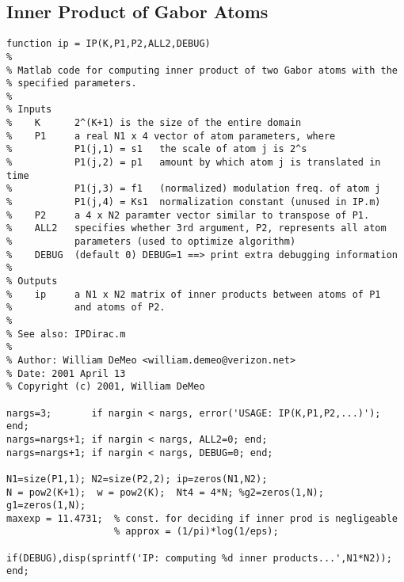 \subsection{Inner Product of Gabor Atoms}\label{sec:IP}
\begin{verbatim}
function ip = IP(K,P1,P2,ALL2,DEBUG)
%
% Matlab code for computing inner product of two Gabor atoms with the
% specified parameters.
%
% Inputs
%    K      2^(K+1) is the size of the entire domain
%    P1     a real N1 x 4 vector of atom parameters, where
%           P1(j,1) = s1   the scale of atom j is 2^s
%           P1(j,2) = p1   amount by which atom j is translated in time
%           P1(j,3) = f1   (normalized) modulation freq. of atom j
%           P1(j,4) = Ks1  normalization constant (unused in IP.m)
%    P2     a 4 x N2 paramter vector similar to transpose of P1.
%    ALL2   specifies whether 3rd argument, P2, represents all atom
%           parameters (used to optimize algorithm)
%    DEBUG  (default 0) DEBUG=1 ==> print extra debugging information
%
% Outputs
%    ip     a N1 x N2 matrix of inner products between atoms of P1
%           and atoms of P2. 
%
% See also: IPDirac.m
%
% Author: William DeMeo <william.demeo@verizon.net>
% Date: 2001 April 13
% Copyright (c) 2001, William DeMeo

nargs=3;       if nargin < nargs, error('USAGE: IP(K,P1,P2,...)'); end; 
nargs=nargs+1; if nargin < nargs, ALL2=0; end; 
nargs=nargs+1; if nargin < nargs, DEBUG=0; end;

N1=size(P1,1); N2=size(P2,2); ip=zeros(N1,N2);
N = pow2(K+1);  w = pow2(K);  Nt4 = 4*N; %g2=zeros(1,N); g1=zeros(1,N);
maxexp = 11.4731;  % const. for deciding if inner prod is negligeable
                   % approx = (1/pi)*log(1/eps); 

if(DEBUG),disp(sprintf('IP: computing %d inner products...',N1*N2)); end;


\end{verbatim}
